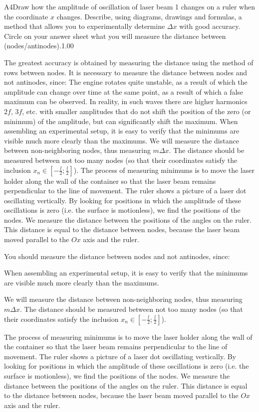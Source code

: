 \documentclass[11pt,a4paper]{article}
\begin{document}
\begin{solcard}{A4}{Draw how the amplitude of oscillation of laser beam 1 changes on a ruler when the coordinate $x$ changes. Describe, using diagrams, drawings and formulas, a method that allows you to experimentally determine $\Delta x$ with good accuracy. Circle on your answer sheet what you will measure the distance between (nodes/antinodes).}{1.00}

The greatest accuracy is obtained by measuring the distance using the method of rows between nodes. It is necessary to measure the distance between nodes and not antinodes, since: The engine rotates quite unstable, as a result of which the amplitude can change over time at the same point, as a result of which a false maximum can be observed. In reality, in such waves there are higher harmonics $2f$, $3f$, etc. with smaller amplitudes that do not shift the position of the zero (or minimum) of the amplitude, but can significantly shift the maximum. When assembling an experimental setup, it is easy to verify that the minimums are visible much more clearly than the maximums. We will measure the distance between non-neighboring nodes, thus measuring $m \Delta x$. The distance should be measured between not too many nodes (so that their coordinates satisfy the inclusion $x_n \in \left[-\frac{l}{2}; \frac{l}{2}\right]$). The process of measuring minimums is to move the laser holder along the wall of the container so that the laser beam remains perpendicular to the line of movement. The ruler shows a picture of a laser dot oscillating vertically. By looking for positions in which the amplitude of these oscillations is zero (i.e. the surface is motionless), we find the positions of the nodes. We measure the distance between the positions of the angles on the ruler. This distance is equal to the distance between nodes, because the laser beam moved parallel to the $Ox$ axis and the ruler.


You should measure the distance between nodes and not antinodes, since:


When assembling an experimental setup, it is easy to verify that the minimums are visible much more clearly than the maximums.


We will measure the distance between non-neighboring nodes, thus measuring $m \Delta x$. The distance should be measured between not too many nodes (so that their coordinates satisfy the inclusion $x_n \in \left[-\frac{l}{2}; \frac{l}{2}\right]$).


The process of measuring minimums is to move the laser holder along the wall of the container so that the laser beam remains perpendicular to the line of movement. The ruler shows a picture of a laser dot oscillating vertically. By looking for positions in which the amplitude of these oscillations is zero (i.e. the surface is motionless), we find the positions of the nodes. We measure the distance between the positions of the angles on the ruler. This distance is equal to the distance between nodes, because the laser beam moved parallel to the $Ox$ axis and the ruler.


\end{solcard}
\end{document}

